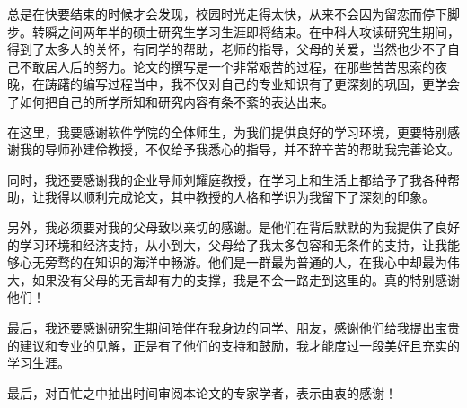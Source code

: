 \begin{acknowledgements}

总是在快要结束的时候才会发现，校园时光走得太快，从来不会因为留恋而停下脚步。转瞬之间两年半的硕士研究生学习生涯即将结束。在中科大攻读研究生期间，得到了太多人的关怀，有同学的帮助，老师的指导，父母的关爱，当然也少不了自己不敢居人后的努力。论文的撰写是一个非常艰苦的过程，在那些苦苦思索的夜晚，在踌躇的编写过程当中，我不仅对自己的专业知识有了更深刻的巩固，更学会了如何把自己的所学所知和研究内容有条不紊的表达出来。

在这里，我要感谢软件学院的全体师生，为我们提供良好的学习环境，更要特别感谢我的导师孙建伶教授，不仅给予我悉心的指导，并不辞辛苦的帮助我完善论文。

同时，我还要感谢我的企业导师刘耀庭教授，在学习上和生活上都给予了我各种帮助，让我得以顺利完成论文，其中教授的人格和学识为我留下了深刻的印象。

另外，我必须要对我的父母致以亲切的感谢。是他们在背后默默的为我提供了良好的学习环境和经济支持，从小到大，父母给了我太多包容和无条件的支持，让我能够心无旁骛的在知识的海洋中畅游。他们是一群最为普通的人，在我心中却最为伟大，如果没有父母的无言却有力的支撑，我是不会一路走到这里的。真的特别感谢他们！

最后，我还要感谢研究生期间陪伴在我身边的同学、朋友，感谢他们给我提出宝贵的建议和专业的见解，正是有了他们的支持和鼓励，我才能度过一段美好且充实的学习生涯。

最后，对百忙之中抽出时间审阅本论文的专家学者，表示由衷的感谢！

\end{acknowledgements}

